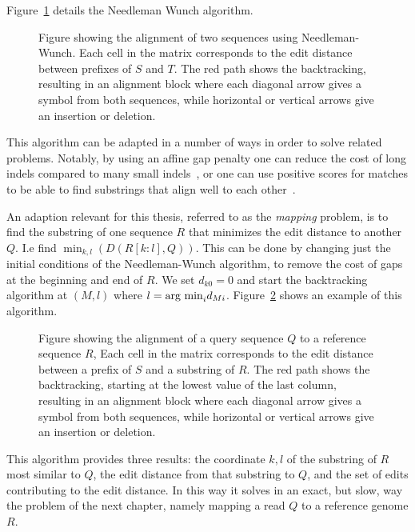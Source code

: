 Figure~\ref{fig:needle} details the Needleman Wunch algorithm.
\begin{figure}
  \centering
  \begin{tikzpicture}
    
  \end{tikzpicture}
  \caption{Figure showing the alignment of two sequences using Needleman-Wunch. Each cell in the matrix corresponds to the edit distance between prefixes of $S$ and $T$. The red path shows the backtracking, resulting in an alignment block where each diagonal arrow gives a symbol from both sequences, while horizontal or vertical arrows give an insertion or deletion.}
  \label{fig:needle}
\end{figure}

This algorithm can be adapted in a number of ways in order to solve related problems.
Notably, by using an affine gap penalty one can reduce the cost of long indels compared to many small indels~\cite{affine}, or one can use positive scores for matches to be able to find substrings that align well to each other~\cite{smithwaterman}.

An adaption relevant for this thesis, referred to as the \emph{mapping} problem, is to find the substring of one sequence $R$ that minimizes the edit distance to another $Q$.
I.e find $\min_{k, l}(D(R[k:l], Q))$.
This can be done by changing just the initial conditions of the Needleman-Wunch algorithm, to remove the cost of gaps at the beginning and end of $R$.
We set $d_{k0} = 0$ and start the backtracking algorithm at $(M, l)$ where $l=\argmin_i d_{Mi}$.
Figure~\ref{fig:needlemanmap} shows an example of this algorithm.
\begin{figure}
  \centering
  \begin{tikzpicture}
    
  \end{tikzpicture}
  \caption{
    Figure showing the alignment of a query sequence $Q$ to a reference sequence $R$, 
    Each cell in the matrix corresponds to the edit distance between a prefix of $S$ and a substring of $R$. The red path shows the backtracking, starting at the lowest value of the last column, resulting in an alignment block where each diagonal arrow gives a symbol from both sequences, while horizontal or vertical arrows give an insertion or deletion.}
  \label{fig:needlemanmap}
\end{figure}
This algorithm provides three results: the coordinate $k, l$ of the substring of $R$ most similar to $Q$, the edit distance from that substring to $Q$, and the set of edits contributing to the edit distance.
In this way it solves in an exact, but slow, way the problem of the next chapter, namely mapping a read $Q$ to a reference genome $R$.


